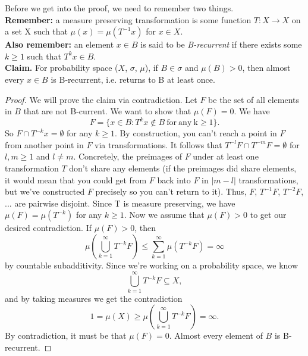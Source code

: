 \documentclass{article}
\begin{document}
Before we get into the proof, we need to remember two things. \\
\textbf{Remember:} a measure preserving transformation is some function $T : X \rightarrow X$ on a set X such that
$\mu(x) = \mu(T^{-1}x)$ for $x \in X$.
\\
\textbf{Also remember:} an element $x \in B$ is said to be \textit{B-recurrent} if there exists some $k \geq 1$
such that $T^{k}x \in B$. 
\\
\textbf{Claim.} For probability space ($X$, $\sigma$, $\mu$), if $B \in \sigma$ and $\mu(B) > 0$, then almost every $x \in B$ is B-recurrent, i.e. returns to B at least once. 
\begin{proof}
We will prove the claim via contradiction. Let $F$ be the set of all elements in $B$ that are not B-current.
We want to show that $\mu(F) = 0$. We have $$ F = \{x \in B : T^{k}x \not\in B\ \mathrm{for\ any\ k \geq 1\}}.$$ 
So $F \cap T^{-k}x = \emptyset$ for any $k \geq 1$. By construction, you can't reach a point in $F$ from another point in $F$ via transformations. 
It follows that $T^{-l}F \cap T^{-m}F = \emptyset$ for $l, m \geq 1$ and $l \neq m$. Concretely, the preimages of $F$ under at least one transformation $T$ 
don't share any elements (if the preimages did share elements, it would mean that you could get from $F$ back into $F$ in $|m - l|$ transformations, but
we've constructed $F$ precisely so you can't return to it). 
Thus, $F$, $T^{-1}F$, $T^{-2}F$, $...$ are pairwise disjoint. Since T is measure preserving, we have $\mu(F) = \mu(T^{-k})$ for any $k \geq 1$. 
Now we assume that $\mu(F) > 0$ to get our desired contradiction. 
If $\mu(F) > 0$, then $$\mu(\bigcup\limits_{k=1}^{\infty} T^{-k}F) \leq \sum\limits_{k = 1}^{\infty} \mu(T^{-k}F) = \infty$$ by countable subadditivity.
Since we're working on a probability space, we know $$\bigcup\limits_{k=1}^{\infty}T^{-k}F \subseteq X,$$ and by taking measures we get the contradiction
$$1 = \mu(X) \geq \mu(\bigcup\limits_{k=1}^{\infty}T^{-k}F) = \infty.$$ By contradiction, it must be that $\mu(F) = 0$. 
Almost every element of $B$ is B-recurrent. 

\end{proof}
\end{document}
